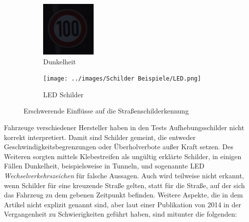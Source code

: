 \begin{figure}[H]
\begin{subfigure}[b]{0.125\textwidth}
       \includegraphics[height=\textwidth]{../images/Schilder Beispiele/Dunkelheit.png}
       \caption{Dunkelheit}
       \label{fig:dunkelheit}
   \end{subfigure}
   \hspace{3em}%
   \begin{subfigure}[b]{0.125\textwidth}
    \centering
    \texttt{[image: ../images/Schilder Beispiele/LED.png]}
    \caption{LED Schilder}
    \label{fig:ledschild}
   \end{subfigure}
      \caption{Erschwerende Einflüsse auf die Straßenschilderkennung \cite{GTSRB} \cite{led-schild}}
      \label{fig:einfluesse-strscherkennung}
\end{figure}

Fahrzeuge verschiedener Hersteller haben in den Tests Aufhebungsschilder nicht korrekt interpretiert. Damit sind Schilder gemeint, die entweder Geschwindigkeitsbegrenzungen oder Überholverbote außer Kraft setzen. Des Weiteren sorgten mittels Klebestreifen als ungültig erklärte Schilder, in einigen Fällen Dunkelheit, beispielsweise in Tunneln, und sogenannte LED \emph{Wechselverkehrszeichen} für falsche Aussagen. Auch wird teilweise nicht erkannt, wenn Schilder für eine kreuzende Straße gelten, statt für die Straße, auf der sich das Fahrzeug zu dem gebenen Zeitpunkt befinden. Weitere Aspekte, die in dem Artikel nicht explizit genannt sind, aber laut einer Publikation von 2014 in der Vergangenheit zu Schwierigkeiten geführt haben, sind mitunter die folgenden: \cite{traffic-sign-detection-review-2014}

